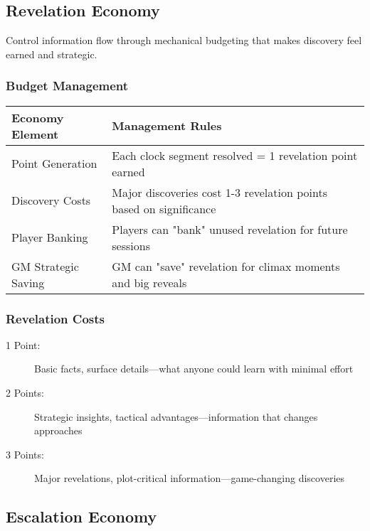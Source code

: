 \subsection*{Revelation Economy}

Control information flow through mechanical budgeting that makes discovery feel earned and strategic.

\subsubsection*{Budget Management}

\begin{fatebox}
\begin{tabularx}{\textwidth}{lX}
\toprule
\textbf{Economy Element} & \textbf{Management Rules} \\
\midrule
Point Generation & Each clock segment resolved = 1 revelation point earned \\
Discovery Costs & Major discoveries cost 1-3 revelation points based on significance \\
Player Banking & Players can "bank" unused revelation for future sessions \\
GM Strategic Saving & GM can "save" revelation for climax moments and big reveals \\
\bottomrule
\end{tabularx}
\end{fatebox}

\subsubsection*{Revelation Costs}

\begin{description}
    \item[1 Point:] Basic facts, surface details---what anyone could learn with minimal effort
    \item[2 Points:] Strategic insights, tactical advantages---information that changes approaches
    \item[3 Points:] Major revelations, plot-critical information---game-changing discoveries
\end{description}

\subsection*{Escalation Economy}

